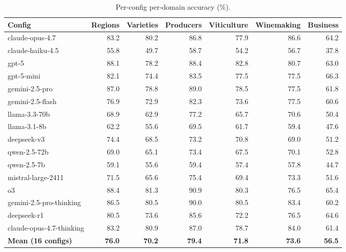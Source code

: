 \begin{table}[H]
  \centering
  \footnotesize
  \caption{Per-config per-domain accuracy (\%).}
  \label{tab:full-domain}
  \begin{tabular}{lrrrrrr}
    \toprule
    Config & Regions & Varieties & Producers & Viticulture & Winemaking & Business \\
    \midrule
    claude-opus-4.7              & 83.2 & 80.2 & 86.8 & 77.9 & 86.6 & 64.2 \\
    claude-haiku-4.5             & 55.8 & 49.7 & 58.7 & 54.2 & 56.7 & 37.8 \\
    gpt-5                        & 88.1 & 78.2 & 88.4 & 82.8 & 80.7 & 63.0 \\
    gpt-5-mini                   & 82.1 & 74.4 & 83.5 & 77.5 & 77.5 & 66.3 \\
    gemini-2.5-pro               & 87.0 & 78.8 & 89.0 & 78.5 & 77.5 & 61.8 \\
    gemini-2.5-flash             & 76.9 & 72.9 & 82.3 & 73.6 & 77.5 & 60.6 \\
    llama-3.3-70b                & 68.9 & 62.9 & 77.2 & 65.7 & 70.6 & 50.4 \\
    llama-3.1-8b                 & 62.2 & 55.6 & 69.5 & 61.7 & 59.4 & 47.6 \\
    deepseek-v3                  & 74.4 & 68.5 & 73.2 & 70.8 & 69.0 & 51.2 \\
    qwen-2.5-72b                 & 69.0 & 65.1 & 73.4 & 67.5 & 70.1 & 52.8 \\
    qwen-2.5-7b                  & 59.1 & 55.6 & 59.4 & 57.4 & 57.8 & 44.7 \\
    mistral-large-2411           & 71.5 & 65.6 & 75.4 & 69.4 & 73.3 & 51.6 \\
    o3                           & 88.4 & 81.3 & 90.9 & 80.3 & 76.5 & 65.4 \\
    gemini-2.5-pro-thinking      & 86.5 & 80.5 & 90.0 & 80.5 & 83.4 & 60.2 \\
    deepseek-r1                  & 80.5 & 73.6 & 85.6 & 72.2 & 76.5 & 64.6 \\
    claude-opus-4.7-thinking     & 83.2 & 80.9 & 87.0 & 78.7 & 84.0 & 61.4 \\
    \midrule
    \textbf{Mean (16 configs)}   & \textbf{76.0} & \textbf{70.2} & \textbf{79.4} & \textbf{71.8} & \textbf{73.6} & \textbf{56.5} \\
    \bottomrule
  \end{tabular}
\end{table}


